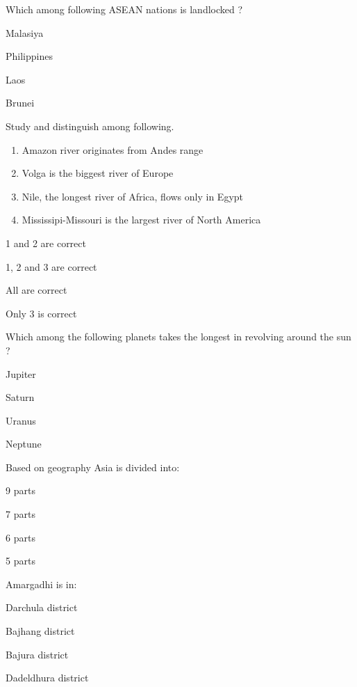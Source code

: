 \begin{questions}
\question Which among following ASEAN nations is landlocked ?
  \begin{items}
  \item Malasiya
  \item Philippines
  \item* Laos
  \item Brunei
  \end{items}

\question Study and distinguish among following.
  \begin{enumerate}
  \item Amazon river originates from Andes range
  \item Volga is the biggest river of Europe
  \item Nile, the longest river of Africa, flows only in Egypt
  \item Mississipi-Missouri is the largest river of North America
  \end{enumerate}
  \begin{items}
  \item 1 and 2 are correct
  \item 1, 2 and 3 are correct
  \item All are correct
  \item* Only 3 is correct
  \end{items}

\question Which among the following planets takes the longest in revolving around the sun ?
  \begin{items}
  \item Jupiter
  \item Saturn
  \item Uranus
  \item* Neptune
  \end{items}

\question Based on geography Asia is divided into:
  \begin{items}
  \item 9 parts
  \item 7 parts
  \item 6 parts
  \item* 5 parts
  \end{items}

\question Amargadhi is in:
  \begin{items}
  \item Darchula district
  \item Bajhang district
  \item Bajura district
  \item* Dadeldhura district
  \end{items}


\end{questions}

